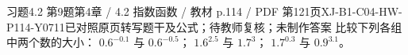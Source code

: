 \par\noindent\begin{minipage}{\linewidth}
\begin{bankitem}{习题4.2 第9题}{第4章 / 4.2 指数函数 / 教材 p.114 / PDF 第121页}{XJ-B1-C04-HW-P114-Y0711}{已对照原页转写题干及公式；待教师复核；未制作答案}
比较下列各组中两个数的大小：
$0.6^{-0.1}$ 与 $0.6^{-0.5}$；
$1.6^{2.5}$ 与 $1.7^3$；
$1.7^{0.3}$ 与 $0.9^{3.1}$。
\end{bankitem}
\end{minipage}\par\medskip
